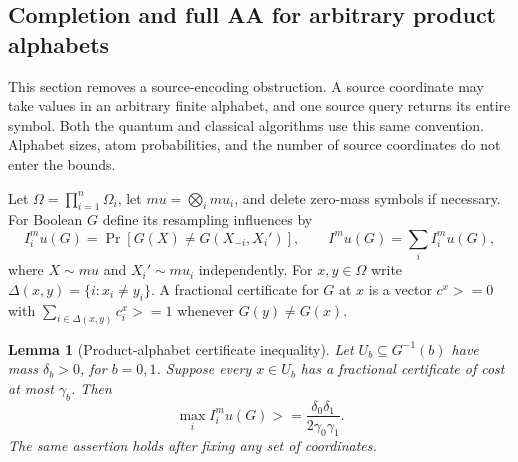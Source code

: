 \documentclass[11pt]{article}
\newtheorem{lemma}[theorem]{Lemma}
\theoremstyle{definition}
\theoremstyle{remark}
\def\mu{mu}\def\rho{rho}\def\le{<=}\def\ge{>=}%
\begin{document}
\subsection{Completion and full AA for arbitrary product alphabets}
\label{sec:resolution-product-alphabets}

This section removes a source-encoding obstruction. A source coordinate
may take values in an arbitrary finite alphabet, and one source query
returns its entire symbol. Both the quantum and classical algorithms
use this same convention. Alphabet sizes, atom probabilities, and the
number of source coordinates do not enter the bounds.

Let \(\Omega=\prod_{i=1}^n\Omega_i\), let
\(\mu=\bigotimes_i\mu_i\), and delete zero-mass symbols if necessary.
For Boolean \(G\) define its resampling influences by
\[
 I_i^\mu(G)=\Pr[G(X)\ne G(X_{-i},X_i')],
 \qquad I^\mu(G)=\sum_i I_i^\mu(G),
\]
where \(X\sim\mu\) and \(X_i'\sim\mu_i\) independently.
For \(x,y\in\Omega\) write
\(\Delta(x,y)=\{i:x_i\ne y_i\}\).
A fractional certificate for \(G\) at \(x\) is a vector
\(c^x\ge0\) with
\(\sum_{i\in\Delta(x,y)}c_i^x\ge1\) whenever \(G(y)\ne G(x)\).

\begin{lemma}[Product-alphabet certificate inequality]
\label{lem:resolution-alphabet-certificates}
Let \(U_b\subseteq G^{-1}(b)\) have mass \(\delta_b>0\), for
\(b=0,1\). Suppose every \(x\in U_b\) has a fractional certificate
of cost at most \(\gamma_b\). Then
\[
 \max_i I_i^\mu(G)\ge\frac{\delta_0\delta_1}{2\gamma_0\gamma_1}.
 \tag{AC}
\]
The same assertion holds after fixing any set of coordinates.
\end{lemma}
\end{document}
